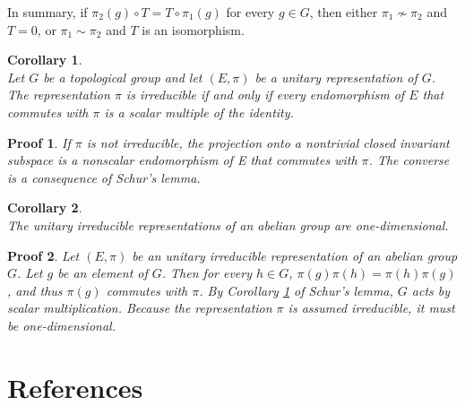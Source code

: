 \documentclass[a4paper,11pt]{article} %
\numberwithin{equation}{section} %
\numberwithin{figure}{section} %
\newtheorem{corol}{Corollary}
\newtheorem{demo}{Proof}
\begin{document}
In summary, if $\pi_2(g) \circ T = T \circ \pi_1(g)$ for every $g \in G$, then either $\pi_1 \nsim \pi_2$ and $T=0$, or $\pi_1 \sim \pi_2$ and $T$ is an isomorphism. 

\begin{corol} \cite[Corol. 3.7, p. 38]{Yvette2005} \label{Corol(1)Shur} \\
Let $G$ be a topological group and let $(E, \pi)$ be a unitary representation of $G$. The representation $\pi$ is irreducible if and only if every endomorphism of $E$ that commutes with $\pi$ is a scalar multiple of the identity. 
\end{corol}

\begin{demo}
If $\pi$ is not irreducible, the projection onto a nontrivial closed invariant subspace is a nonscalar endomorphism of E that commutes with $\pi$. The converse is a consequence of Schur’s lemma. 
\end{demo}

\begin{corol} \cite[Corol. 3.8, p. 39]{Yvette2005} \\
The unitary irreducible representations of an abelian group are one-dimensional. 
\end{corol}

\begin{demo}
Let $(E,\pi)$ be an unitary irreducible representation of an abelian group $G$. Let $g$ be an element of $G$. Then for every $h \in G$, $\pi(g)\pi(h) = \pi(h)\pi(g)$, and thus $\pi(g)$ commutes with $\pi$. By Corollary \ref{Corol(1)Shur} of Schur’s lemma, $G$ acts by scalar multiplication. Because the representation $\pi$ is assumed irreducible, it must be one-dimensional. 
\end{demo}

\section{References}

\renewcommand{\section}[2]{}
 

%
%
%
%
%

%
%
\end{document}
